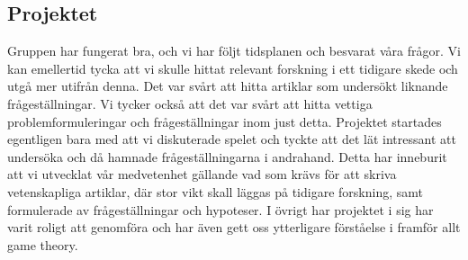 \subsection{Projektet}
Gruppen har fungerat bra, och vi har följt tidsplanen och besvarat våra frågor. Vi kan emellertid tycka att vi skulle hittat relevant forskning i ett tidigare skede och utgå mer utifrån denna. Det var svårt att hitta artiklar som undersökt liknande frågeställningar. Vi tycker också att det var svårt att hitta vettiga problemformuleringar och frågeställningar inom just detta. Projektet startades egentligen bara med att vi diskuterade spelet och tyckte att det lät intressant att undersöka och då hamnade frågeställningarna i andrahand. Detta har inneburit att vi utvecklat vår medvetenhet gällande vad som krävs för att skriva vetenskapliga artiklar, där stor vikt skall läggas på tidigare forskning, samt formulerade av frågeställningar och hypoteser. I övrigt har projektet i sig har varit roligt att genomföra och har även gett oss ytterligare förståelse i framför allt game theory.